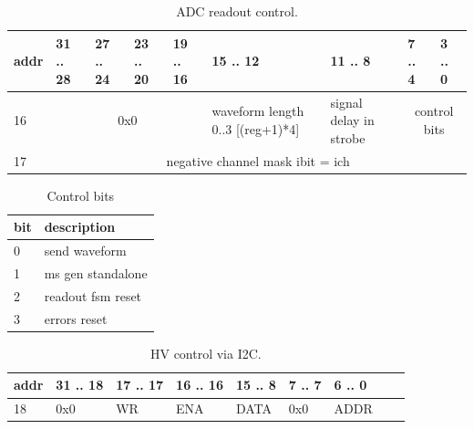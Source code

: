\documentclass{article}
\begin{document}
\begin{table}[H]
\centering
\begin{tabular}{| l | l | l | l | l | l | l | l | l |}
\hline
addr & 31 .. 28 & 27 .. 24 & 23 .. 20 & 19 .. 16 & 15 .. 12 & 11 .. 8 & 7 .. 4 & 3 .. 0 \\ \hline
16 & \multicolumn{4}{c|}{0x0} & waveform length 0..3 [(reg+1)*4] & signal delay in strobe & \multicolumn{2}{c|}{control bits} \\ \hline
17 & \multicolumn{8}{c|}{negative channel mask ibit = ich} \\ \hline
\end{tabular}
\caption{ADC readout control.\label{tab3}}
\end{table}

\begin{table}[H]
\centering
\begin{tabular}{| l | l |}
\hline
bit & description \\ \hline
0 & send waveform \\ \hline
1 & ms gen standalone \\ \hline
2 & readout fsm reset \\ \hline
3 & errors reset \\ \hline
\end{tabular}
\caption{Control bits\label{tab4}}
\end{table}


\begin{table}[H]
\centering
\begin{tabular}{| l | l | l | l | l | l | l | l | l |}
\hline
addr & 31 .. 18 & 17 .. 17 & 16 .. 16 & 15 .. 8 & 7 .. 7 & 6 .. 0 \\ \hline
18 & 0x0 & WR & ENA & DATA & 0x0 & ADDR \\ \hline
\end{tabular}
\caption{HV control via I2C.\label{tab5}}
\end{table}
\end{document}
